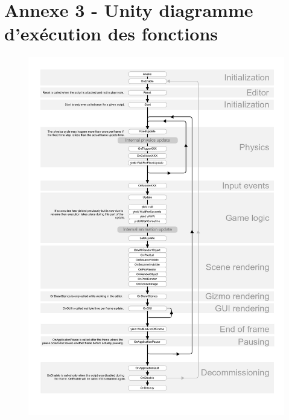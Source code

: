 \chapter*{Annexe 3 - Unity diagramme d'exécution des fonctions}
\label{annexe:unity}

\begin{figure}
\centering
\includegraphics[width=\linewidth]{images/monobehaviour_flowchart}
\end{figure}